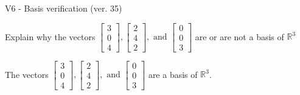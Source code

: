 \begin{exercise}
  \begin{exerciseTitle}V6 - Basis verification (ver. 35)\end{exerciseTitle}
  \begin{exerciseStatement}
    Explain why the vectors \(\left[\begin{array}{r}
3 \\
0 \\
4
\end{array}\right] , \left[\begin{array}{r}
2 \\
4 \\
2
\end{array}\right] , \text{ and } \left[\begin{array}{r}
0 \\
0 \\
3
\end{array}\right]\) are or are not a basis of \(\mathbb{R}^3\)	


  \end{exerciseStatement}
  \begin{exerciseAnswer}
   The vectors \(\left[\begin{array}{r}
3 \\
0 \\
4
\end{array}\right] , \left[\begin{array}{r}
2 \\
4 \\
2
\end{array}\right] , \text{ and } \left[\begin{array}{r}
0 \\
0 \\
3
\end{array}\right]\) 
  	 are  a basis of \(\mathbb{R}^3\).
  


  \end{exerciseAnswer}
\end{exercise}